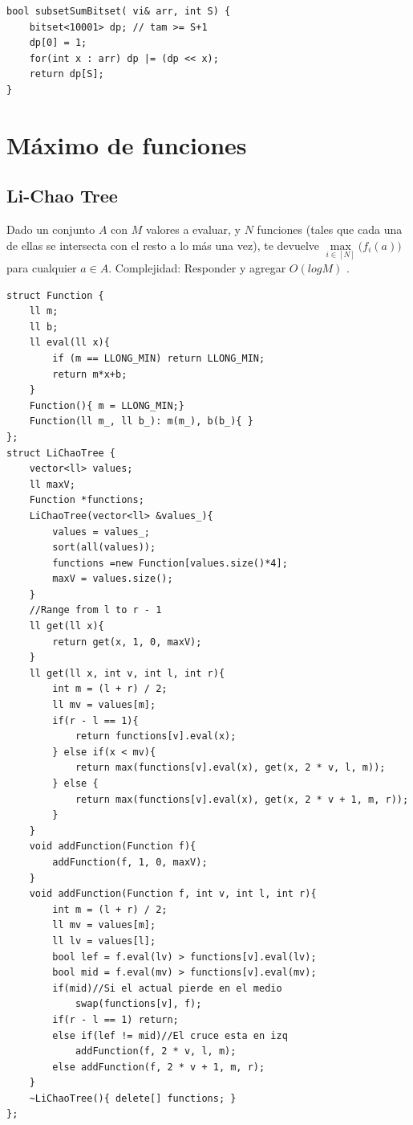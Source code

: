 \documentclass[10pt,spanish,mexico]{article}
\numberwithin{equation}{section}
\begin{document}
\begin{multicols}{2}
\begin{verbatim}
bool subsetSumBitset( vi& arr, int S) {
    bitset<10001> dp; // tam >= S+1
    dp[0] = 1;
    for(int x : arr) dp |= (dp << x);
    return dp[S];
}
\end{verbatim}

\vspace{-1.2\baselineskip}
\hrulefill
\section{Máximo de funciones}

\subsection{Li-Chao Tree}
Dado un conjunto $A$ con $M$ valores a evaluar, y $N$ funciones (tales que cada una de ellas se intersecta con el resto a lo más una vez), te devuelve $\max\limits_{i\in [N]} \big(f_i(a)\big)$ para cualquier  $a\in A$. Complejidad: Responder y agregar $O(log M)$ .

\begin{verbatim}
struct Function {
    ll m;
    ll b;
    ll eval(ll x){
        if (m == LLONG_MIN) return LLONG_MIN;
        return m*x+b;
    }
    Function(){ m = LLONG_MIN;}
    Function(ll m_, ll b_): m(m_), b(b_){ }
};
struct LiChaoTree {
    vector<ll> values;
    ll maxV;
    Function *functions;
    LiChaoTree(vector<ll> &values_){
        values = values_;
        sort(all(values));
        functions =new Function[values.size()*4];
        maxV = values.size();
    }
    //Range from l to r - 1
    ll get(ll x){
        return get(x, 1, 0, maxV);
    }
    ll get(ll x, int v, int l, int r){
        int m = (l + r) / 2;
        ll mv = values[m];
        if(r - l == 1){
            return functions[v].eval(x);
        } else if(x < mv){
            return max(functions[v].eval(x), get(x, 2 * v, l, m));
        } else {
            return max(functions[v].eval(x), get(x, 2 * v + 1, m, r));
        }
    }
    void addFunction(Function f){
        addFunction(f, 1, 0, maxV);
    }
    void addFunction(Function f, int v, int l, int r){
        int m = (l + r) / 2;
        ll mv = values[m];
        ll lv = values[l];
        bool lef = f.eval(lv) > functions[v].eval(lv);
        bool mid = f.eval(mv) > functions[v].eval(mv);
        if(mid)//Si el actual pierde en el medio
            swap(functions[v], f);
        if(r - l == 1) return;
        else if(lef != mid)//El cruce esta en izq
            addFunction(f, 2 * v, l, m);
        else addFunction(f, 2 * v + 1, m, r);
    }
    ~LiChaoTree(){ delete[] functions; }
};
\end{verbatim}
\vspace{-1.2\baselineskip}
\hrulefill

\end{multicols}

\end{document}
